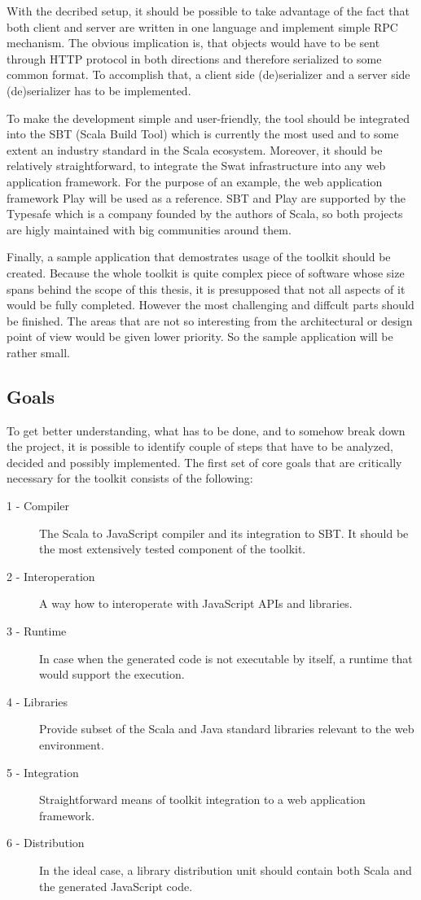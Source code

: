 \documentclass[12pt,a4paper]{report}
\begin{document}
With the decribed setup, it should be possible to take advantage of the fact that both client and server are written in one language and implement simple RPC mechanism. The obvious implication is, that objects would have to be sent through HTTP protocol in both directions and therefore serialized to some common format. To accomplish that, a client side (de)serializer and a server side (de)serializer has to be implemented.

To make the development simple and user-friendly, the tool should be integrated into the SBT (Scala Build Tool\cite{Sbt}) which is currently the most used and to some extent an industry standard in the Scala ecosystem. Moreover, it should be relatively straightforward, to integrate the Swat infrastructure into any web application framework. For the purpose of an example, the web application framework Play\cite{Play} will be used as a reference. SBT and Play are supported by the Typesafe\cite{Typesafe} which is a company founded by the authors of Scala, so both projects are higly maintained with big communities around them.

Finally, a sample application that demostrates usage of the toolkit should be created. Because the whole toolkit is quite complex piece of software whose size spans behind the scope of this thesis, it is presupposed that not all aspects of it would be fully completed. However the most challenging and diffcult parts should be finished. The areas that are not so interesting from the architectural or design point of view would be given lower priority. So the sample application will be rather small.

\subsection{Goals}

To get better understanding, what has to be done, and to somehow break down the project, it is possible to identify couple of steps that have to be analyzed, decided and possibly implemented. The first set of core goals that are critically necessary for the toolkit consists of the following:

\begin{description}
\item[1 - Compiler] The Scala to JavaScript compiler and its integration to SBT. It should be the most extensively tested component of the toolkit.
\item[2 - Interoperation] A way how to interoperate with JavaScript APIs and libraries.
\item[3 - Runtime] In case when the generated code is not executable by itself, a runtime that would support the execution.
\item[4 - Libraries] Provide subset of the Scala and Java standard libraries relevant to the web environment.
\item[5 - Integration] Straightforward means of toolkit integration to a web application framework.
\item[6 - Distribution] In the ideal case, a library distribution unit should contain both Scala and the generated JavaScript code.
\end{description}
\end{document}

